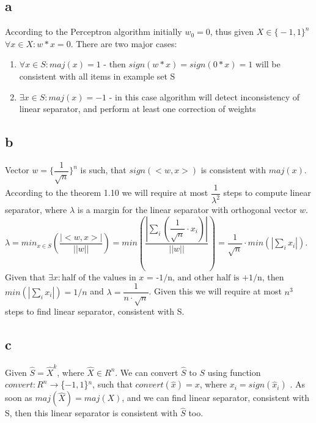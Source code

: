 \subsection*{a}
According to the Perceptron algorithm initially $w_0 = 0$, thus given $X\in \text{\{}-1,1\text{\}}^n$ $\forall x \in X: w*x = 0$.
There are two major cases:
\begin{enumerate}
	\item $\forall x \in S: maj(x) = 1$ - then $sign(w*x) = sign(0*x) = 1$ will be consistent with all items in example set S
	\item $\exists x \in S: maj(x) = -1$ - in this case algorithm will detect inconsistency of linear separator, and perform at least one correction of weights 
\end{enumerate}

\subsection*{b}
Vector $w = \text{\{}\dfrac{1}{\sqrt{n}}\text{\}}^n$ is such, that $sign(<w,x>)$ is consistent with $maj(x)$.
According to the theorem 1.10 we will require at most 
$\dfrac{1}{\lambda^2}$ 
steps to compute linear separator, where $\lambda$ is a margin for the linear separator with orthogonal vector $w$. 
$\lambda = min_{x \in S}(\dfrac{|<w,x>|}{||w||}) = min(\dfrac{|\sum_i(\dfrac{1}{\sqrt{n}} \cdot x_i)|}{||w||}) = \dfrac{1}{\sqrt{n}} \cdot min(|\sum_i x_i|)$. 
Given that $\exists x: \text{half of the values in $x$ = -1/n, and other half is +1/n}$, 
then $min(|\sum_i x_i|) = 1/n$ and $\lambda = \dfrac{1}{n\cdot\sqrt{n}}$. 
Given this we will require at most $n^3$ steps to find linear separator, consistent with S.

\subsection*{c}
Given $\hat{S} = \hat{X}^k$, where $\hat{X} \in R^n$. 
We can convert $\hat{S} \text{ to }  S$ using function $convert: R^n \to $\{$-1,1$\}$^n$, such that $convert(\hat{x}) = x$, where $x_i = sign(\hat{x}_i)$ . 
As soon as $maj(\hat{X}) = maj(X)$, and we can find linear separator, consistent with S, then this linear separator is consistent with $\hat{S}$ too.